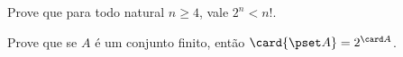 \begin{exercise}
%
	Prove que para todo natural $n \geq 4$, vale $2^{n} < n!$.
\end{exercise}

\begin{exercise}
%
%
	Prove que se $A$ é um conjunto finito, então $\card{\pset A} = 2^{\card A}$.
\end{exercise}

